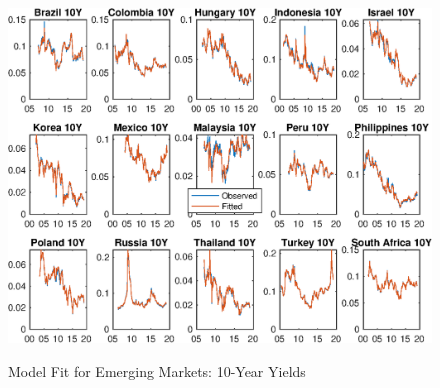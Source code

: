 \documentclass{article}
\begin{document}
\begin{figure}[tbph]
	\begin{center}
		\caption{Model Fit for Emerging Markets: 10-Year Yields}
		\label{fig:s_ylds_ssb_yQ}
		\includegraphics[trim={0cm 0cm 0cm 0cm},clip,height=1\textheight,width=1.4\textwidth]{../Figures/Estimation/s_ylds_ssb_yQ.eps} \\
	\end{center}
\end{figure}
\end{document}
